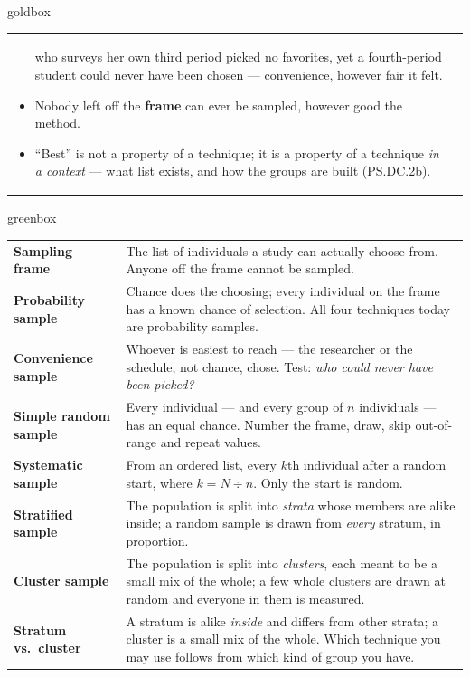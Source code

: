 \documentclass[10pt]{article}
\begin{document}
\begin{skillbox}{goldbox}
\begin{tabularx}{\linewidth}{@{}X|X@{}}
\begin{itemize}[leftmargin=1.1em, nosep, after=\vspace{2pt}]
        who surveys her own third period picked no favorites, yet a fourth-period student could
        never have been chosen --- convenience, however fair it felt.
  \item Nobody left off the \textbf{frame} can ever be sampled, however good the method.
  \item ``Best'' is not a property of a technique; it is a property of a technique \emph{in a
        context} --- what list exists, and how the groups are built (PS.DC.2b).
\end{itemize}
\end{tabularx}
\end{skillbox}

\boxguard[24]
\begin{skillbox}{greenbox}
\small
\renewcommand{\arraystretch}{1.35}
\begin{tabularx}{\linewidth}{@{} >{\bfseries}p{3.1cm} X @{}}
Sampling frame & The list of individuals a study can actually choose from. Anyone off the
       frame cannot be sampled. \\
Probability sample & Chance does the choosing; every individual on the frame has a known
       chance of selection. All four techniques today are probability samples. \\
Convenience sample & Whoever is easiest to reach --- the researcher or the schedule, not
       chance, chose. Test: \emph{who could never have been picked?} \\
Simple random sample & Every individual --- and every group of $n$ individuals --- has an
       equal chance. Number the frame, draw, skip out-of-range and repeat values. \\
Systematic sample & From an ordered list, every $k$th individual after a random start, where
       $k = N \div n$. Only the start is random. \\
Stratified sample & The population is split into \emph{strata} whose members are alike
       inside; a random sample is drawn from \emph{every} stratum, in proportion. \\
Cluster sample & The population is split into \emph{clusters}, each meant to be a small mix
       of the whole; a few whole clusters are drawn at random and everyone in them is
       measured. \\
Stratum vs.\ cluster & A stratum is alike \emph{inside} and differs from other strata; a
       cluster is a small mix of the whole. Which technique you may use follows from which
       kind of group you have. \\
\end{tabularx}
\end{skillbox}
\end{document}
